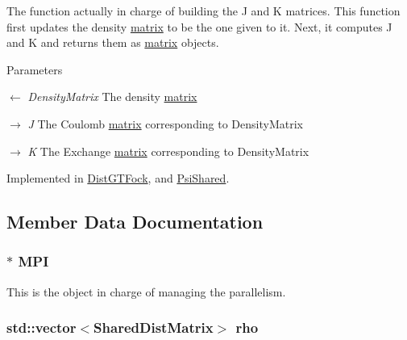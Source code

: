 The function actually in charge of building the J and K matrices. This function first updates the density \hyperlink{classJKBuilder_1_1matrix}{matrix} to be the one given to it. Next, it computes J and K and returns them as \hyperlink{classJKBuilder_1_1matrix}{matrix} objects.


\begin{DoxyParams}{Parameters}
\item[\mbox{$\leftarrow$} {\em DensityMatrix}]The density \hyperlink{classJKBuilder_1_1matrix}{matrix} \item[\mbox{$\rightarrow$} {\em J}]The Coulomb \hyperlink{classJKBuilder_1_1matrix}{matrix} corresponding to DensityMatrix \item[\mbox{$\rightarrow$} {\em K}]The Exchange \hyperlink{classJKBuilder_1_1matrix}{matrix} corresponding to DensityMatrix \end{DoxyParams}


Implemented in \hyperlink{classGTFock_1_1DistGTFock_aea85d0b3d84e8e52819e8a15201e078a}{DistGTFock}, and \hyperlink{classJKBuilder_1_1PsiShared_aa5f73a8109ec88464262262164feda1e}{PsiShared}.

\subsection{Member Data Documentation}
\hypertarget{classJKBuilder_1_1DistributionCenter_a3753afd7c89e077643a274ed7c4e9129}{
\subsubsection[{MPI}]{$\ast$ {\bf MPI}}}
\label{classJKBuilder_1_1DistributionCenter_a3753afd7c89e077643a274ed7c4e9129}


This is the object in charge of managing the parallelism. \hypertarget{classJKBuilder_1_1DistributionCenter_aea5bfaa6247d7c03edf480fa8ecdd929}{
\subsubsection[{rho}]{\setlength{\rightskip}{0pt plus 5cm}std::vector$<${\bf SharedDistMatrix}$>$ {\bf rho}}}
\label{classJKBuilder_1_1DistributionCenter_aea5bfaa6247d7c03edf480fa8ecdd929}


